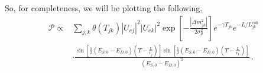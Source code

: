 \documentclass[10pt]{article}
\begin{document}
So, for completeness, we will be plotting the following,
\begin{equation}
  \begin{split}
    \mathcal{P} \propto & \sum_{j,k}\theta(T_{jk})|U_{ej}|^{2}|U_{ek}|^{2}\exp\left[-\frac{|\Delta m_{jk}^{2}|}{2\sigma^{2}_{p}}\right]e^{-\gamma T_{jk}}e^{-L/L_{jk}^{\text{coh}}} \\
    & \cdot \frac{\sin\left[\frac{1}{2}(E_{S,0} - E_{D,0})(T - \frac{L}{v_{j}})\right]\sin\left[\frac{1}{2}(E_{S,0} - E_{D,0})(T - \frac{L}{v_{k}})\right]}{(E_{S,0} - E_{D,0})^{2}}\, .
  \end{split}
\end{equation}

  


\newpage
%



\end{document}
